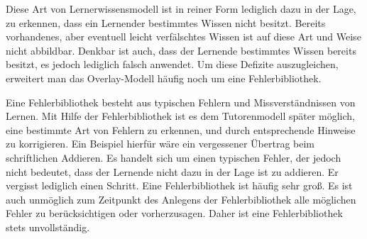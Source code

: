 Diese Art von Lernerwissensmodell ist in reiner Form lediglich dazu in der Lage, zu erkennen,
dass ein Lernender bestimmtes Wissen nicht besitzt.
Bereits vorhandenes, aber eventuell leicht verfälschtes Wissen ist auf diese Art und Weise nicht abbildbar.
Denkbar ist auch, dass der Lernende bestimmtes Wissen bereits besitzt, es jedoch lediglich falsch anwendet.
Um diese Defizite auszugleichen, erweitert man das Overlay-Modell häufig noch um eine Fehlerbibliothek.

Eine Fehlerbibliothek besteht aus typischen Fehlern und Missverständnissen von Lernen.
Mit Hilfe der Fehlerbibliothek ist es dem Tutorenmodell später möglich, eine bestimmte Art von
Fehlern zu erkennen, und durch entsprechende Hinweise zu korrigieren.
Ein Beispiel hierfür wäre ein vergessener Übertrag beim schriftlichen Addieren.
Es handelt sich um einen typischen Fehler, der jedoch nicht bedeutet, dass der Lernende nicht dazu in der Lage ist
zu addieren. Er vergisst lediglich einen Schritt.
Eine Fehlerbibliothek ist häufig sehr groß. Es ist auch unmöglich zum Zeitpunkt des Anlegens der Fehlerbibliothek
alle möglichen Fehler zu berücksichtigen oder vorherzusagen. Daher ist eine Fehlerbibliothek stets unvollständig.

